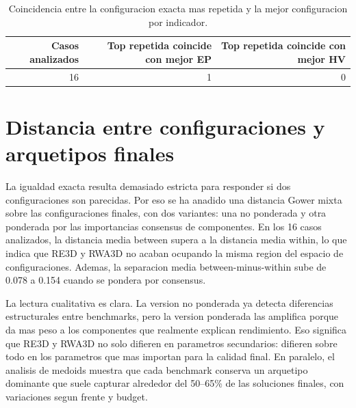 \documentclass[11pt,a4paper]{article}
\begin{document}
{\scriptsize
\begin{table}[p]
\centering
\caption{Coincidencia entre la configuracion exacta mas repetida y la mejor configuracion por indicador.}
\label{tab:repeated_best_match}
\begin{tabular}{rrr}
\toprule
Casos analizados & Top repetida coincide con mejor EP & Top repetida coincide con mejor HV \\
\midrule
16 & 1 & 0 \\
\bottomrule
\end{tabular}
\end{table}

}

\section{Distancia entre configuraciones y arquetipos finales}

La igualdad exacta resulta demasiado estricta para responder si dos configuraciones son parecidas. Por eso se ha anadido una distancia Gower mixta sobre las configuraciones finales, con dos variantes: una no ponderada y otra ponderada por las importancias consensus de componentes. En los 16 casos analizados, la distancia media between supera a la distancia media within, lo que indica que RE3D y RWA3D no acaban ocupando la misma region del espacio de configuraciones. Ademas, la separacion media between-minus-within sube de 0.078 a 0.154 cuando se pondera por consensus.

La lectura cualitativa es clara. La version no ponderada ya detecta diferencias estructurales entre benchmarks, pero la version ponderada las amplifica porque da mas peso a los componentes que realmente explican rendimiento. Eso significa que RE3D y RWA3D no solo difieren en parametros secundarios: difieren sobre todo en los parametros que mas importan para la calidad final. En paralelo, el analisis de medoids muestra que cada benchmark conserva un arquetipo dominante que suele capturar alrededor del 50--65\% de las soluciones finales, con variaciones segun frente y budget.
\end{document}
